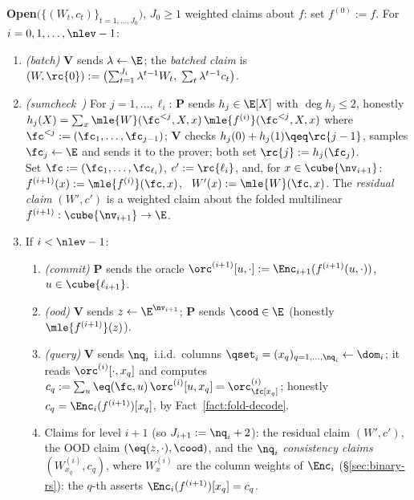 \begin{protocol}
\smallskip
\textbf{Open}$\bigl(\{(W_t, c_t)\}_{t = 1, \dots, J_0}\bigr)$, $J_0 \ge 1$ weighted claims about $f$: set $f^{(0)} := f$. For $i = 0, 1, \dots, \nlev - 1$:
\begin{enumerate}[itemsep=0.5pt,topsep=2pt]
\item \emph{(batch)} $\mathbf{V}$ sends $\lambda \leftarrow \E$; the \emph{batched claim} is $(W, \rc{0}) := \bigl(\sum_{t = 1}^{J_i} \lambda^{t-1} W_t,\; \sum_{t} \lambda^{t-1} c_t\bigr)$.
\item \emph{(sumcheck~\cite{LFKN92})} For $j = 1, \dots, \ell_i$: $\mathbf{P}$ sends $h_j \in \E[X]$ with $\deg h_j \le 2$, honestly $h_j(X) = \sum_{x} \mle{W}(\fc^{<j}, X, x)\, \mle{f^{(i)}}(\fc^{<j}, X, x)$ where $\fc^{<j} := (\fc_1, \dots, \fc_{j-1})$; $\mathbf{V}$ checks $h_j(0) + h_j(1) \qeq \rc{j-1}$, samples $\fc_j \leftarrow \E$ and sends it to the prover; both set $\rc{j} := h_j(\fc_j)$.\\
Set $\fc := (\fc_1, \dots, \fc_{\ell_i})$, $c' := \rc{\ell_i}$, and, for $x \in \cube{\nv_{i+1}}$: \ $f^{(i+1)}(x) := \mle{f^{(i)}}(\fc, x)$, \ $W'(x) := \mle{W}(\fc, x)$. The \emph{residual claim} $(W', c')$ is a weighted claim about the folded multilinear $f^{(i+1)} : \cube{\nv_{i+1}} \to \E$.
\item If $i < \nlev - 1$:
\begin{enumerate}[itemsep=0.5pt,topsep=1pt,label=(\alph*)]
\item \emph{(commit)} $\mathbf{P}$ sends the oracle $\orc^{(i+1)}[u, \cdot] := \Enc_{i+1}(f^{(i+1)}(u, \cdot))$, $u \in \cube{\ell_{i+1}}$.
\item \emph{(ood)} $\mathbf{V}$ sends $z \leftarrow \E^{\nv_{i+1}}$; $\mathbf{P}$ sends $\cood \in \E$ (honestly $\mle{f^{(i+1)}}(z)$).
\item \emph{(query)} $\mathbf{V}$ sends $\nq_i$ i.i.d.\ columns $\qset_i = (x_q)_{q = 1, \dots, \nq_i} \leftarrow \dom_i$; it reads $\orc^{(i)}[\cdot, x_q]$ and computes $c_q := \sum_{u} \eq(\fc, u)\, \orc^{(i)}[u, x_q] = \orc^{(i)}_\fc[x_q]$; honestly $c_q = \Enc_i(f^{(i+1)})[x_q]$, by Fact~\ref{fact:fold-decode}.
\item Claims for level $i+1$ (so $J_{i+1} := \nq_i + 2$): the residual claim $(W', c')$, the OOD claim $(\eq(z, \cdot), \cood)$, and the $\nq_i$ \emph{consistency claims} $(W^{(i)}_{x_q}, c_q)$, where $W^{(i)}_x$ are the column weights of $\Enc_i$ (\S\ref{sec:binary-rs}): the $q$-th asserts $\Enc_i(f^{(i+1)})[x_q] = c_q$.
\end{enumerate}

\end{enumerate}
\end{protocol}
